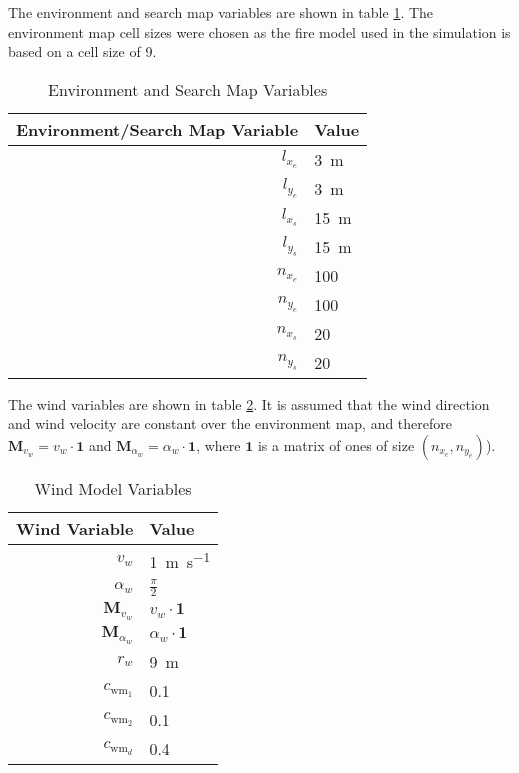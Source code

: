 \documentclass[conference]{IEEEtran}
\begin{document}
The environment and search map variables are shown in table \ref{tab:settings_general_cell}.
The environment map cell sizes were chosen as the fire model used in the simulation is based on a cell size of \SI{9}{\meter \square}.

\begin{table}[]
    \centering
    \caption{Environment and Search Map Variables}
    \label{tab:settings_general_cell}
    \begin{tabular}{r|l}
    \toprule
        Environment/Search Map Variable & Value \\
        \midrule
        $ l_{x_{e}} $ & \SI{3}{\meter}\\
        $ l_{y_{e}} $ & \SI{3}{\meter}\\ 
        $ l_{x_{s}} $ & \SI{15}{\meter}\\
        $ l_{y_{s}} $ & \SI{15}{\meter}\\
        $ n_{x_{e}} $ & 100\\
        $ n_{y_{e}} $ & 100\\
        $ n_{x_{s}} $ & 20\\
        $ n_{y_{s}} $ & 20\\
        \bottomrule
    \end{tabular}
\end{table}

The wind variables are shown in table \ref{tab:settings_general_wind}.
It is assumed that the wind direction and wind velocity are constant over the environment map, and therefore $\bm{M}_{v_{w}} =v_{w} \cdot \bm{1} $ and $\bm{M}_{\alpha_{w}} = \alpha_{w} \cdot \bm{1}$, where $\bm{1}$ is a matrix of ones of size $(n_{x_{e}}, n_{y_{e}})$).

\begin{table}[]
    \centering
    \caption{Wind Model Variables}
    \label{tab:settings_general_wind}
    \begin{tabular}{r|l}
    \toprule
        Wind Variable & Value \\
        \midrule
        $v_{w}$                     & \SI{1}{\meter \per \second}\\
        $\alpha_{w}$                & $\frac{\pi}{2}$ \\
        $\bm{M}_{v_{w}}$            & $v_{w} \cdot \bm{1}$\\
        $\bm{M}_{\alpha_{w}}$       & $\alpha_{w} \cdot \bm{1}$\\
        $r_{w}$                     & \SI{9}{\meter} \\
        $c_{\text{wm}_{1}}$         & 0.1 \\
        $c_{\text{wm}_{2}}$         & 0.1 \\
        $c_{\text{wm}_{d}}$         & 0.4 \\
        \bottomrule
    \end{tabular}
\end{table}
\end{document}
